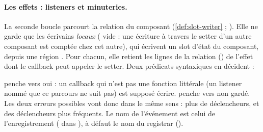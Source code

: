 \paragraph{Les effets : listeners et minuteries.} La seconde boucle parcourt la relation
 du composant (\cref{def:slot-writer} ;
). Elle ne garde que les écrivains
\emph{locaux} ( vide : une écriture à travers le setter d'un autre composant est
comptée chez cet autre), qui écrivent un slot d'état du composant, depuis une région
. Pour chacun, elle retient les lignes de la relation
 () de l'effet  dont le callback peut appeler le setter.
Deux prédicats syntaxiques en décident :


 penche vers \og oui\fg{} : un callback qui n'est pas une fonction littérale (un
listener nommé que ce parcours ne suit pas) est supposé écrire.  penche vers
\og non gardé\fg{}. Les deux erreurs possibles vont donc dans le même sens : plus de déclencheurs,
et des déclencheurs plus fréquents. Le nom de l'événement est celui de l'enregistrement
( dans ), à défaut le nom du registrar
().

